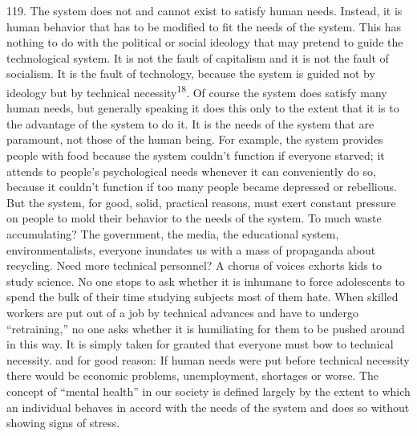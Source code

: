 \documentclass{article}
\begin{document}
119. The system does not and cannot exist to satisfy human needs. Instead, it is human behavior 
that has to be modified to fit the needs of the system. This has nothing to do with the political or 
social ideology that may pretend to guide the technological system. It is not the fault of capitalism 
and it is not the fault of socialism. It is the fault of technology, because the system is guided not 
by ideology but by technical necessity\textsuperscript{18}. Of course the system does satisfy many human needs, 
but generally speaking it does this only to the extent that it is to the advantage of the system to do 
it. It is the needs of the system that are paramount, not those of the human being. For example, 
the system provides people with food because the system couldn’t function if everyone starved; it 
attends to people’s psychological needs whenever it can conveniently do so, because it couldn’t 
function if too many people became depressed or rebellious. But the system, for good, solid, 
practical reasons, must exert constant pressure on people to mold their behavior to the needs of the 
system. To much waste accumulating? The government, the media, the educational system, 
environmentalists, everyone inundates us with a mass of propaganda about recycling. Need more 
technical personnel? A chorus of voices exhorts kids to study science. No one stops to ask whether 
it is inhumane to force adolescents to spend the bulk of their time studying subjects most of them 
hate. When skilled workers are put out of a job by technical advances and have to undergo 
“retraining,” no one asks whether it is humiliating for them to be pushed around in this way. It is 
simply taken for granted that everyone must bow to technical necessity. and for good reason: If 
human needs were put before technical necessity there would be economic problems, 
unemployment, shortages or worse. The concept of “mental health” in our society is defined 
largely by the extent to which an individual behaves in accord with the needs of the system and 
does so without showing signs of stress. \vspace{\baselineskip}
\end{document}
